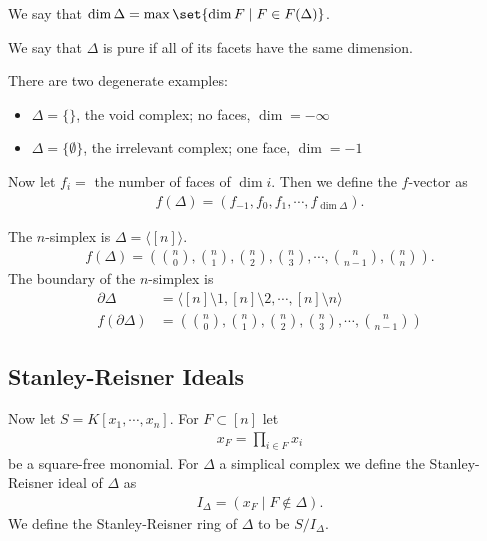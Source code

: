 \begin{definition}
    We say that $\dim \Delta  = \max \set{ \dim F \mid F \in F( \Delta) } $.
\end{definition}

\begin{definition}
    We say that $\Delta$ is pure if all of its facets have the same dimension.
\end{definition}

\begin{remark}
    There are two degenerate examples:
    \begin{itemize}
        \item $\Delta = \{ \} $, the void complex;  no faces, $\dim = - \infty$
        \item $\Delta = \{ \emptyset \} $, the irrelevant complex; one face, $\dim = -1$
    \end{itemize}
\end{remark}

\begin{definition}
    Now let $f_i =$ the number of faces of $\dim i$. Then we define the $f$-vector as
    \begin{align*}
        f(\Delta ) = (f_{-1}, f_0 , f_1, \cdots , f_{\dim \Delta}).
    \end{align*}
\end{definition}

\begin{example}
    The $n$-simplex is $\Delta = \langle [n] \rangle$.
    \begin{align*}
        f(\Delta ) =  \left( \binom{n}{0},\binom{n}{1}, \binom{n}{2}, \binom{n}{3 } , \cdots, \binom{n}{n-1}, \binom{n}{n} \right).
    \end{align*}
    The boundary of the $n$-simplex is
    \begin{align*}
        \partial \Delta &= \langle [n] \setminus 1, [n] \setminus 2 , \cdots  , [n] \setminus n\rangle\\
        f(\partial \Delta ) &= \left( \binom{n}{0},\binom{n}{1}, \binom{n}{2}, \binom{n}{3 } , \cdots, \binom{n}{n-1} \right)
    \end{align*}
\end{example}

\subsection{Stanley-Reisner Ideals}

\begin{definition}
Now let $S = K [ x_1, \cdots, x_n]$. For $F \subset [n]$ let
\begin{align*}
    x_F = \prod_{i \in F} x_i
\end{align*}
be a square-free monomial. For $\Delta $ a simplical complex we define the Stanley-Reisner ideal of $\Delta$ as
\begin{align*}
    I_\Delta = ( x_F \mid F \notin \Delta ).
\end{align*}
We define the Stanley-Reisner ring of $\Delta$ to be $S / I_\Delta$.
\end{definition}

